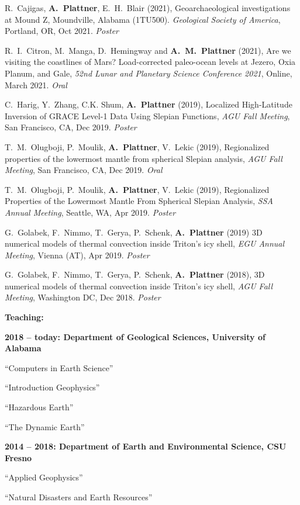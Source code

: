 \documentclass[10pt]{article}
\begin{document}
\spcp R.~Cajigas, \textbf{A.~Plattner}, E.~H.~Blair (2021),
Geoarchaeological investigations at Mound Z, Moundville, Alabama
(1TU500). \emph{Geological Society of America}, Portland, OR, Oct
2021. \emph{Poster}

\spcp R.~I.~Citron, M.~Manga, D.~Hemingway and \textbf{A.~M.~Plattner}
(2021), Are we visiting the coastlines of Mars? Load-corrected
paleo-ocean levels at Jezero, Oxia Planum, and Gale, \emph{52nd Lunar
and Planetary Science Conference 2021}, Online, March 2021.
\emph{Oral}

\spcp
C.~Harig, Y.~Zhang, C.K. Shum, \textbf{A.~Plattner} (2019),
Localized High-Latitude Inversion of GRACE Level-1 Data Using Slepian Functions,
\emph{AGU Fall Meeting}, San Francisco, CA, Dec 2019. \emph{Poster}

\spcp
T.~M.~Olugboji, P.~Moulik, \textbf{A.~Plattner}, V.~Lekic (2019),
Regionalized properties of the lowermost mantle from spherical Slepian analysis,
\emph{AGU Fall Meeting}, San Francisco, CA, Dec 2019. \emph{Oral}

\spcp T.~M.~Olugboji, P.~Moulik, \textbf{A.~Plattner}, V.~Lekic
(2019), Regionalized Properties of the Lowermost Mantle From Spherical
Slepian Analysis, \emph{SSA Annual Meeting}, Seattle, WA, Apr
2019. \emph{Poster}

\spcp
G.~Golabek, F.~Nimmo, T.~Gerya, P.~Schenk, \textbf{A.~Plattner} (2019)
3D numerical models of thermal convection inside Triton’s icy
shell, \emph{EGU Annual Meeting}, Vienna (AT), Apr 2019. \emph{Poster}

\spcp
 G.~Golabek, F.~Nimmo, T.~Gerya, P.~Schenk, \textbf{A.~Plattner} (2018),
3D numerical models of thermal convection inside Triton's icy
shell, \emph{AGU Fall Meeting}, Washington DC, Dec 2018. \emph{Poster}




\clearpage
\textbf{\tsize Teaching:}

\spcp
\textbf{2018 -- today: Department of Geological Sciences,
University of Alabama}

``Computers in Earth Science''

``Introduction Geophysics''

``Hazardous Earth''

``The Dynamic Earth''


\spcp
\textbf{2014 -- 2018:  Department of Earth and Environmental Science, CSU Fresno}

``Applied Geophysics''

``Natural Disasters and Earth Resources''
\end{document}
